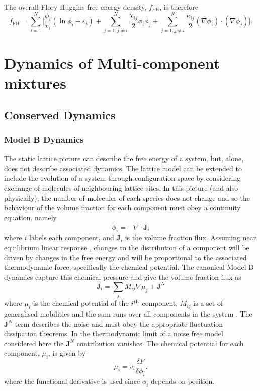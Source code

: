 The overall Flory Huggins free energy density, $f_\text{FH}$, is therefore
\begin{equation}
    f_\text{FH} = \sum_{i=1}^{N}\Bigg[\frac{\phi_i}{v_i}(\ln\phi_i+\varepsilon_i)+\sum_{j=1, j\neq i}^{N}\frac{\chi_{ij}}{2}\phi_i\phi_j + \sum_{j=1, j\neq i}^{N} \frac{\kappa_{ij}}{2}(\nabla\phi_i)\cdot(\nabla\phi_j)\Bigg].
    \label{fh_gen}
\end{equation}

\section{Dynamics of Multi-component mixtures}

\subsection{Conserved Dynamics}

\subsubsection{Model B Dynamics}
The static lattice picture can describe the free energy of a system, but, alone, does not describe associated dynamics. The lattice model can be extended to include the evolution of a system through configuration space by considering exchange of molecules of neighbouring lattice sites. In this picture (and also physically), the number of molecules of each species does not change and so the behaviour of the volume fraction for each component must obey a continuity equation, namely
\begin{equation}
    \dot{\phi}_i = - \nabla \cdot \textbf{J}_i
    \label{eq:2-continuityModB}
\end{equation}
where $i$ labels each component, and $\textbf{J}_i$ is the volume fraction flux. \cite{li_non-equilibrium_2020} Assuming near equilibrium linear response \cite{groot_non-equilibrium_1984}, changes to the distribution of a component will be driven by changes in the free energy and will be proportional to the associated thermodynamic force, specifically the chemical potential. The canonical Model B dynamics capture this chemical pressure and give the volume fraction flux as
\begin{equation}
    \textbf{J}_i = \sum_j M_{ij}\nabla\mu_j + \textbf{J}^N
    \label{eq:2-fluxModB}
\end{equation}
where $\mu_i$ is the chemical potential of the $i\textsuperscript{th}$ component, $M_{ij}$ is a set of generalised mobilities and the sum runs over all components in the system \cite{hohenberg_theory_1977, li_non-equilibrium_2020}. The $\textbf{J}^N$ term describes the noise and must obey the appropriate fluctuation dissipation theorems. In the thermodynamic limit of a noise free model considered here the $ \textbf{J}^N$ contribution vanishes. The chemical potential for each component, $\mu_i$, is given by
\begin{equation}
    \mu_i = v_i\frac{\delta F}{\delta \phi_i}.
\end{equation}
where the functional derivative is used since $\phi_i$ depends on position.

